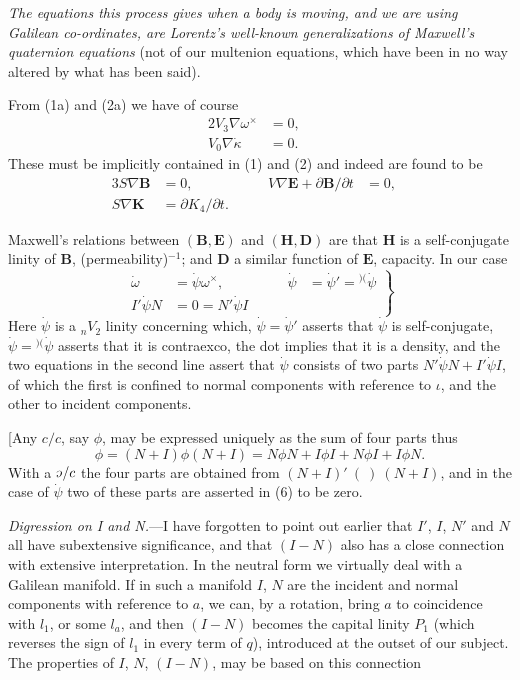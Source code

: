 \documentclass[11pt]{article}
\newcommand{\invc}{\mathord{\rotatebox[origin=c]{180}{$c$}}}
\newcommand{\invc}{\mathord{\text{\invcfont ɔ}}}
\newcommand{\markpair}[3]{{}^{#1#2}#3}
\begin{document}
\indent \emph{The equations this process gives when a body is moving, and we are using Galilean co-ordinates, are Lorentz's well-known generalizations of Maxwell's quaternion equations} (not of our multenion equations, which have been in no way altered by what has been said).

\indent From (1a) and (2a) we have of course
\begin{alignat}{2}
  V_3\nabla\omega^\times&=0, &\tag{4}\\
  V_0\nabla\dot\kappa&=0. &\tag{5}
\end{alignat}
These must be implicitly contained in (1) and (2) and indeed are found to be
\begin{alignat}{3}
  S\nabla\mathbf{B}&=0, &\qquad V\nabla\mathbf{E}+\partial\mathbf{B}/\partial t&=0, &\tag{4a}\\
  S\nabla\mathbf{K}&=\partial K_4/\partial t. & & &\tag{5a}
\end{alignat}

\indent Maxwell's relations between $(\mathbf{B},\mathbf{E})$ and $(\mathbf{H},\mathbf{D})$ are that $\mathbf{H}$ is a self-conjugate linity of $\mathbf{B}$, (permeability)$^{-1}$; and $\mathbf{D}$ a similar function of $\mathbf{E}$, capacity. In our case
\begin{equation}
  \left.\begin{aligned}
    \dot\omega&=\dot\psi\omega^\times, &\qquad \dot\psi&=\dot\psi'=\markpair{)}{(}{\dot\psi}\\
    I'\dot\psi N&=0=N'\dot\psi I
  \end{aligned}\right\}
  \tag{6}
\end{equation}
Here $\dot\psi$ is a ${}_nV_2$ linity concerning which, $\dot\psi=\dot\psi'$ asserts that $\dot\psi$ is self-conjugate, $\dot\psi=\markpair{)}{(}{\dot\psi}$ asserts that it is contraexco, the dot implies that it is a density, and the two equations in the second line assert that $\dot\psi$ consists of two parts $N'\dot\psi N+I'\dot\psi I$, of which the first is confined to normal components with reference to $\iota$, and the other to incident components.

\indent [Any $c/c$, say $\phi$, may be expressed uniquely as the sum of four parts thus
\[
  \phi=(N+I)\phi(N+I)=N\phi N+I\phi I+N\phi I+I\phi N.
\]
With a $\invc/c$ the four parts are obtained from $(N+I)'\ (\ )\ (N+I)$, and in the case of $\dot\psi$ two of these parts are asserted in (6) to be zero.

\indent \emph{Digression on I and N.}---I have forgotten to point out earlier that $I'$, $I$, $N'$ and $N$ all have subextensive significance, and that $(I-N)$ also has a close connection with extensive interpretation. In the neutral form we virtually deal with a Galilean manifold. If in such a manifold $I$, $N$ are the incident and normal components with reference to $a$, we can, by a rotation, bring $a$ to coincidence with $l_1$, or some $l_a$, and then $(I-N)$ becomes the capital linity $P_1$ (which reverses the sign of $l_1$ in every term of $q$), introduced at the outset of our subject. The properties of $I$, $N$, $(I-N)$, may be based on this connection
\end{document}
